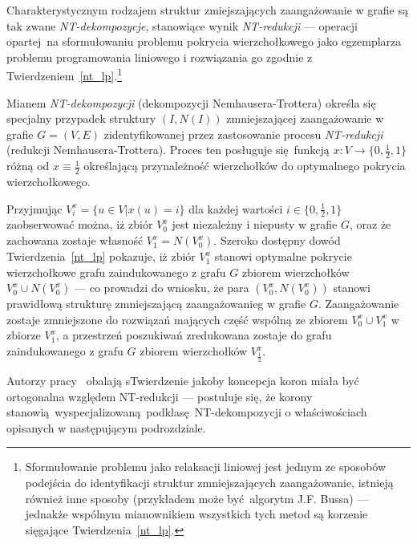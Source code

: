 {  Charakterystycznym rodzajem struktur zmiejszających zaangażowanie w grafie są tak zwane \emph{NT-dekompozycje}, stanowiące wynik \emph{NT-redukcji} --- operacji opartej na sformułowaniu problemu pokrycia wierzchołkowego jako egzemplarza problemu programowania liniowego i rozwiązania go zgodnie z Twierdzeniem~\ref{nt_lp}.\footnote{Sformułowanie problemu jako relaksacji liniowej jest jednym ze sposobów podejścia do identyfikacji struktur zmniejszających zaangażowanie, istnieją również inne sposoby (przykładem może być algorytm J.F. Bussa) --- jednakże wspólnym mianownikiem wszystkich tych metod są korzenie sięgające Twierdzenia~\ref{nt_lp}.}
  \begin{definition}
    Mianem \emph{NT-dekompozycji} (dekompozycji Nemhausera-Trottera) określa się specjalny przypadek struktury $(I, N(I))$ zmniejszającej zaangażowanie w grafie $G=(V, E)$ zidentyfikowanej przez zastosowanie procesu \emph{NT-redukcji} (redukcji Nemhausera-Trottera).
    Proces ten posługuje się funkcją $x: V \rightarrow \{0, \frac{1}{2}, 1\}$ różną od $x \equiv \frac{1}{2}$ określającą przynależność wierzchołków do optymalnego pokrycia wierzchołkowego.
  \end{definition}
  Przyjmując $V_i^x=\{u \in V| x(u)=i\}$ dla każdej wartości $i\in \{0, \frac{1}{2}, 1\}$ zaobserwować można, iż zbiór $V_0^x$ jest niezależny i niepusty w grafie $G$, oraz że zachowana zostaje własność $V_1^x = N(V_0^x)$.
  Szeroko dostępny dowód Twierdzenia~\ref{nt_lp} pokazuje, iż zbiór $V_1^x$ stanowi optymalne pokrycie wierzchołkowe grafu zaindukowanego z grafu $G$ zbiorem wierzchołków $V_0^x \cup N(V_0^x)$ --- co prowadzi do wniosku, że para $(V_0^x, N(V_0^x))$ stanowi prawidłową strukturę zmniejszającą zaangażowanieg w grafie $G$.
  Zaangażowanie zostaje zmniejszone do rozwiązań mających część wspólną ze zbiorem $V_0^x \cup V_1^x$ w zbiorze $V_1^x$, a przestrzeń poszukiwań zredukowana zostaje do grafu zaindukowanego z grafu $G$ zbiorem wierzchołków $V_\frac{1}{2}^x$.
}
\par{
  Autorzy pracy~\cite{chlebik:crown} obalają sTwierdzenie jakoby koncepcja koron miała być ortogonalna względem NT-redukcji --- postuluje się, że korony stanowią wyspecjalizowaną podklasę NT-dekompozycji o właściwościach opisanych w następującym podrozdziale.
}
